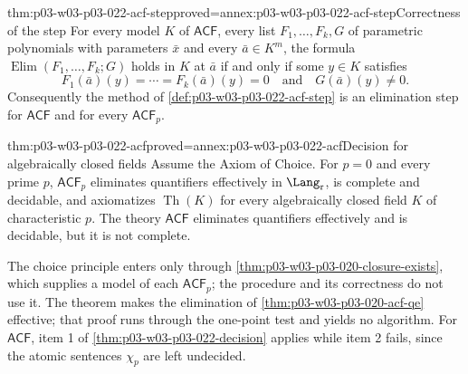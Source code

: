 \begin{hbtheorem}{thm:p03-w03-p03-022-acf-step}{proved=annex:p03-w03-p03-022-acf-step}{Correctness of the step}
For every model \(K\) of \(\mathsf{ACF}\), every list
\(F_1,\ldots,F_k,G\) of parametric polynomials with parameters \(\bar x\)
and every \(\bar a\in K^m\), the formula
\(\operatorname{Elim}(F_1,\ldots,F_k;G)\) holds in \(K\) at \(\bar a\)
if and only if some \(y\in K\) satisfies
\[
F_1(\bar a)(y)=\cdots=F_k(\bar a)(y)=0
\quad\text{and}\quad G(\bar a)(y)\ne0 .
\]
Consequently the method of \cref{def:p03-w03-p03-022-acf-step} is an
elimination step for \(\mathsf{ACF}\) and for every \(\mathsf{ACF}_p\).
\end{hbtheorem}

\begin{hbtheorem}{thm:p03-w03-p03-022-acf}{proved=annex:p03-w03-p03-022-acf}{Decision for algebraically closed fields}
Assume the Axiom of Choice. For \(p=0\) and every prime \(p\),
\(\mathsf{ACF}_p\) eliminates quantifiers effectively in
\(\Lang_{\mathrm r}\), is complete and decidable, and axiomatizes
\(\operatorname{Th}(K)\) for every algebraically closed field \(K\) of
characteristic \(p\). The theory \(\mathsf{ACF}\) eliminates quantifiers
effectively and is decidable, but it is not complete.
\end{hbtheorem}

The choice principle enters only through
\cref{thm:p03-w03-p03-020-closure-exists}, which supplies a model of each
\(\mathsf{ACF}_p\); the procedure and its correctness do not use it. The
theorem makes the elimination of \cref{thm:p03-w03-p03-020-acf-qe}
effective; that proof runs through the one-point test and yields no
algorithm. For \(\mathsf{ACF}\), item 1 of
\cref{thm:p03-w03-p03-022-decision} applies while item 2 fails, since the
atomic sentences \(\chi_p\) are left undecided.


